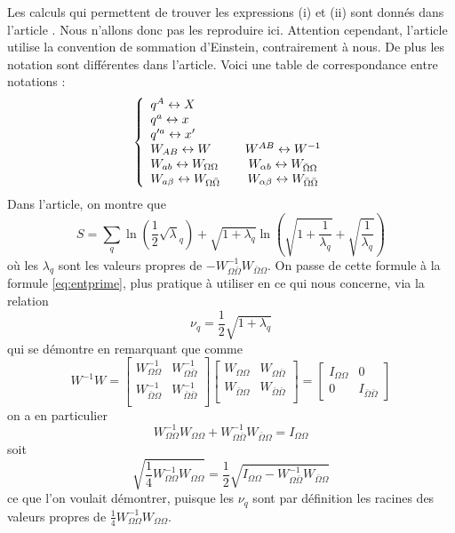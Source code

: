 \documentclass[a4paper, french]{report}
\newcommand{\om}{\ensuremath{\Omega}\xspace}
\newcommand{\bom}{\ensuremath{\bar{\Omega}}\xspace}
\newcommand{\1}{\ensuremath{\ket{\om_1\bom_1}}\xspace}
\newcommand{\2}{\ensuremath{\ket{\om_2\bom_2}}\xspace}
\begin{document}
Les calculs qui permettent de trouver les expressions (i) et (ii) sont donnés dans l'article \cite{blackholes}. Nous n'allons donc pas les reproduire ici.
Attention cependant, l'article utilise la convention de sommation d'Einstein, contrairement à nous. De plus les notation sont différentes dans l'article. Voici une table de correspondance entre notations :
\begin{equation}
\left\{
	\begin{array}{l c c}
		q^A \leftrightarrow X\\
		q^a \leftrightarrow x\\
		q'^a \leftrightarrow x'\\
		W_{AB} \leftrightarrow W && W^{AB} \leftrightarrow W^{-1} \\
		W_{ab} \leftrightarrow W_{\om\om} && W_{\alpha b} \leftrightarrow W_{\bom\om}\\
		W_{a \beta} \leftrightarrow W_{\om\bom} && W_{\alpha \beta} \leftrightarrow W_{\bom\bom}
	\end{array}
\right.
\end{equation}
Dans l'article, on montre que 
\begin{equation}
	S=\sum_q\ln \left(\frac{1}{2}\sqrt \lambda_q\right)+\sqrt{1+\lambda_q}\ln \left(\sqrt{1+\frac{1}{\lambda_q}}+\sqrt{\frac{1}{\lambda_q}}\right)
\end{equation}
où les $\lambda_q$ sont les valeurs propres de $-W_{\om\bom}^{-1}W_{\bom\om}$. On passe de cette formule à la formule \ref{eq:entprime}, plus pratique à utiliser en ce qui nous concerne, via la relation
\begin{equation}
	\nu_q=\frac{1}{2}\sqrt{1+\lambda_q}
\end{equation}
qui se démontre en remarquant que comme
\begin{equation}
	W^{-1}W=
	\begin{bmatrix}
	W^{-1}_{\om\om} & W^{-1}_{\om\bom}\\
	W^{-1}_{\bom\om} & W^{-1}_{\bom\bom}\\
	\end{bmatrix}
	\begin{bmatrix}
	W_{\om\om} & W_{\om\bom}\\
	W_{\bom\om} & W_{\bom\bom}\\
	\end{bmatrix}
	=
	\begin{bmatrix}
	I_{\om\om} & 0\\
	0 & I_{\bom\bom}
	\end{bmatrix}
\end{equation}
on a en particulier
\begin{equation}
	W^{-1}_{\om\om}W_{\om\om}+W_{\om\bom}^{-1}W_{\bom\om}=I_{\om\om}
\end{equation}
soit 
\begin{equation}
	\sqrt{\frac{1}{4}W_{\om\om}^{-1}W_{\om\om}}=\frac{1}{2}\sqrt{I_{\om\om}-W_{\om\bom}^{-1}W_{\bom\om}}
\end{equation}
ce que l'on voulait démontrer, puisque les $\nu_q$ sont par définition les racines des valeurs propres de $\frac{1}{4}W_{\om\om}^{-1}W_{\om\om}$.
\end{document}
